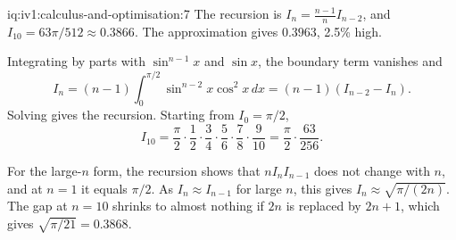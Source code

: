 \begin{solution}{iq:iv1:calculus-and-optimisation:7}
The recursion is $I_n = \frac{n - 1}{n}I_{n - 2}$, and $I_{10} = 63\pi/512 \approx 0.3866$. The approximation gives $0.3963$, 2.5\% high.

Integrating by parts with $\sin^{n - 1}x$ and $\sin x$, the boundary term vanishes and
\[
I_n = (n - 1)\int_0^{\pi/2}\sin^{n - 2}x\cos^2 x\,dx = (n - 1)(I_{n - 2} - I_n).
\]
Solving gives the recursion. Starting from $I_0 = \pi/2$,
\[
I_{10} = \frac{\pi}{2}\cdot\frac12\cdot\frac34\cdot\frac56\cdot\frac78\cdot\frac{9}{10} = \frac{\pi}{2}\cdot\frac{63}{256}.
\]

For the large-$n$ form, the recursion shows that $nI_nI_{n - 1}$ does not change with $n$, and at $n = 1$ it equals $\pi/2$. As $I_n \approx I_{n - 1}$ for large $n$, this gives $I_n \approx \sqrt{\pi/(2n)}$. The gap at $n = 10$ shrinks to almost nothing if $2n$ is replaced by $2n + 1$, which gives $\sqrt{\pi/21} = 0.3868$.



\end{solution}

